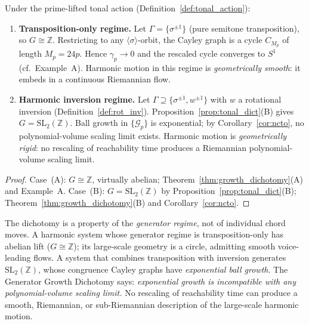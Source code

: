 \begin{corollary}
  \label{cor:tonal}
  Under the prime-lifted tonal action (Definition~\ref{def:tonal_action}):
  \begin{enumerate}
    \item[\emph{(A)}] \textbf{Transposition-only regime.}
      Let $\Gamma = \{\sigma^{\pm 1}\}$ (pure semitone transposition), so
      $G \cong \mathbb{Z}$.
      Restricting to any $\langle\sigma\rangle$-orbit, the Cayley graph is a cycle
      $C_{M_p}$ of length $M_p = 24p$.  Hence $\gamma_p \to 0$ and the rescaled cycle
      converges to $S^1$ (cf.\ Example~A).
      Harmonic motion in this regime is \emph{geometrically smooth}: it embeds in a
      continuous Riemannian flow.

    \item[\emph{(B)}] \textbf{Harmonic inversion regime.}
      Let $\Gamma \supseteq \{\sigma^{\pm 1}, w^{\pm 1}\}$ with $w$ a rotational
      inversion (Definition~\ref{def:rot_inv}).
      Proposition~\ref{prop:tonal_dict}(B) gives $G = \mathrm{SL}_2(\mathbb{Z})$.
      Ball growth in $\{\mathcal{G}_p\}$ is exponential; by
      Corollary~\ref{cor:ncto}, no polynomial-volume scaling limit exists.
      Harmonic motion is \emph{geometrically rigid}: no rescaling of
      reachability time produces a Riemannian polynomial-volume scaling limit.
  \end{enumerate}
\end{corollary}

\begin{proof}
  Case~(A): $G \cong \mathbb{Z}$, virtually abelian;
  Theorem~\ref{thm:growth_dichotomy}(A) and Example~A.
  Case~(B): $G = \mathrm{SL}_2(\mathbb{Z})$ by
  Proposition~\ref{prop:tonal_dict}(B);
  Theorem~\ref{thm:growth_dichotomy}(B) and Corollary~\ref{cor:ncto}.
\end{proof}

\begin{remark}
  The dichotomy is a property of the \emph{generator regime}, not of individual chord
  moves.  A harmonic system whose generator regime is transposition-only has abelian lift
  ($G \cong \mathbb{Z}$); its large-scale geometry is a circle, admitting smooth
  voice-leading flows.
  A system that combines transposition with inversion generates $\mathrm{SL}_2(\mathbb{Z})$,
  whose congruence Cayley graphs have \emph{exponential ball growth}.
  The Generator Growth Dichotomy says: \emph{exponential growth is incompatible
  with any polynomial-volume scaling limit.}
  No rescaling of reachability time can produce a smooth, Riemannian, or
  sub-Riemannian description of the large-scale harmonic motion.
\end{remark}

%
%   
